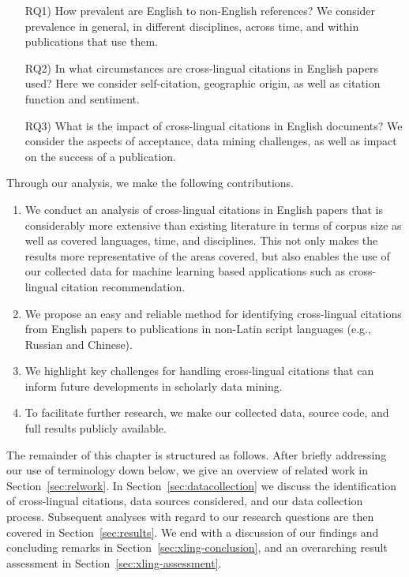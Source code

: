 \begin{enumerate}[align=left]
\item[RQ1)] How prevalent are English to non-English references? We consider prevalence in general, in different disciplines, across time, and within publications that use them.
\item[RQ2)] In what circumstances are cross-lingual citations in English papers used? Here we consider self-citation, geographic origin, as well as citation function and sentiment.
\item[RQ3)] What is the impact of cross-lingual citations in English documents? We consider the aspects of acceptance, data mining challenges, as well as impact on the success of a publication.
\end{enumerate}

\noindent Through our analysis, we make the following contributions.

\begin{enumerate}
\item We conduct an analysis of cross-lingual citations in English papers that is considerably more extensive than existing literature in terms of corpus size as well as covered languages, time, and disciplines. This not only makes the results more representative of the areas covered, but also enables the use of our collected data for machine learning based applications such as cross-lingual citation recommendation.
\item We propose an easy and reliable method for identifying cross-lingual citations from English papers to publications in non-Latin script languages (e.g., Russian and Chinese).
\item We highlight key challenges for handling cross-lingual citations that can inform future developments in scholarly data mining.
\item To facilitate further research, we make our collected data, source code, and full results publicly available.
\end{enumerate}

The remainder of this chapter is structured as follows. After briefly addressing our use of terminology down below, we give an overview of related work in Section~\ref{sec:relwork}. In Section~\ref{sec:datacollection} we discuss the identification of cross-lingual citations, data sources considered, and our data collection process. Subsequent analyses with regard to our research questions are then covered in Section~\ref{sec:results}. We end with a discussion of our findings and concluding remarks in Section~\ref{sec:xling-conclusion}, and an overarching result assessment in Section~\ref{sec:xling-assessment}.

